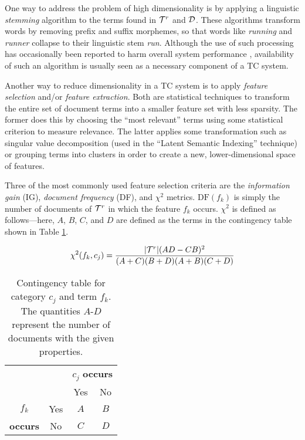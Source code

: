 One way to address the problem of high dimensionality is by applying a
linguistic \emph{stemming} algorithm to the terms found in $\mathcal{T}^r$
and $\mathcal{D}$.  These algorithms transform words by removing prefix and
suffix morphemes, so that words like \emph{running} and \emph{runner}
collapse to their linguistic stem \emph{run}.  Although the use of
such processing has occasionally been reported to harm overall system
performance \cite{baker:98}, availability of such an algorithm is
usually seen as a necessary component of a TC
system.\cite[p. 12]{sebastiani:02}

Another way to reduce dimensionality in a TC system is to apply
\emph{feature selection} and/or \emph{feature extraction}.  Both are
statistical techniques to transform the entire set of document terms
into a smaller feature set with less sparsity.  The former does this
by choosing the ``most relevant'' terms using some statistical
criterion to measure relevance.  The latter
applies some transformation such as singular value decomposition (used
in the ``Latent Semantic Indexing'' technique) or grouping terms into clusters in
order to create a new, lower-dimensional space of features.

Three of the most commonly used feature selection criteria are the
\emph{information gain} (IG), \emph{document frequency} (DF), and
\emph{$\chi^2$} metrics.\cite{yang:97} $\text{DF}(f_k)$ is simply the
number of documents of $\mathcal{T}^r$ in which the feature $f_k$ occurs.
$\chi^2$ is defined as follows---here, $A$, $B$, $C$, and $D$ are
defined as the terms in the contingency table shown in Table
\ref{termcat-contingency}.

\begin{align*}
\chi^2(f_k,c_j) & = \frac{|\mathcal{T}^r|(AD-CB)^2}{(A+C)(B+D)(A+B)(C+D)} \\
\end{align*}


\begin{table}
\begin{center}
\begin{tabular}{|c|c|c|c|}
\cline{3-4}
\multicolumn{2}{c|}{} & \multicolumn{2}{c|}{$c_j$ \textbf{occurs}} \\
\cline{3-4}
\multicolumn{2}{c|}{} & Yes & No \\
\hline
$f_k$           & Yes & $A$ & $B$ \\
\cline{2-4}
\textbf{occurs} & No  & $C$ & $D$ \\
\hline
\end{tabular}
\end{center}
\caption{Contingency table for category $c_j$ and term $f_k$.  The
  quantities $A$-$D$ represent the number of documents with the given
  properties.}
\label{termcat-contingency}
\end{table}


